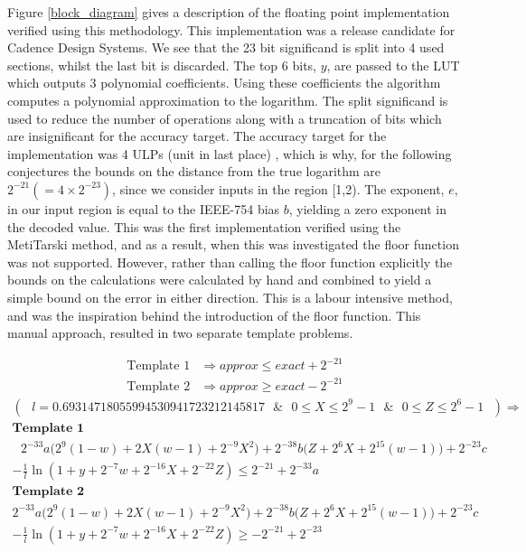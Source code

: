 \documentclass{fac}
\begin{document}
Figure \ref{block_diagram} gives a description of the floating point implementation verified using this methodology. This implementation was a release candidate for Cadence Design Systems. We see that the 23 bit significand is split into 4 used sections, whilst the last bit is discarded. The top 6 bits, $y$, are passed to the LUT which outputs 3 polynomial coefficients. Using these coefficients the algorithm computes a polynomial approximation to the logarithm. The split significand is used to reduce the number of operations along with a truncation of bits which are insignificant for the accuracy target. The accuracy target for the implementation was 4 ULPs (unit in last place) \cite{muller2010handbook}, which is why, for the following conjectures the bounds on the distance from the true logarithm are $2^{-21}(=4\times 2^{-23})$, since we consider inputs in the region [1,2). The exponent, $e$, in our input region is equal to the IEEE-754 bias $b$, yielding a zero exponent in the decoded value. This was the first implementation verified using the MetiTarski method, and as a result, when this was investigated the floor function was not supported. However, rather than calling the floor function explicitly the bounds on the calculations were calculated by hand and combined to yield a simple bound on the error in either direction. This is a labour intensive method, and was the inspiration behind the introduction of the floor function. This manual approach, resulted in two separate template problems. 

\begin{align*}
    \textrm{Template 1} &\Rightarrow approx \leq exact + 2^{-21} \\
    \textrm{Template 2} &\Rightarrow approx \geq exact - 2^{-21}
\end{align*}
\begin{multline*}
(\textrm{ }l=0.69314718055994530941723212145817\textrm{ } \&\textrm{ } 0\leq X \leq2^9-1\textrm{ } \& \textrm{ }0\leq Z \leq 2^6-1\textrm{ }) \Rightarrow \\ 
\textbf{Template 1} \\
  \textrm{ }  2^{-33} a\Big(2^9(1-w)+2X(w-1)+ 2^{-9}X^{2}\Big)   +  2^{-38} b\Big(Z +2^{6}X + 2^{15}(w-1)\Big)+  2^{-23}c\\
-  \frac{1}{l}\ln(1+y+2^{-7}w+2^{-16}X+2^{-22}Z)      \leq 2^{-21}+2^{-33}a 
\end{multline*} 
\begin{multline*}
\textbf{Template 2} \\
2^{-33} a\Big(2^9(1-w)+2X(w-1)+ 2^{-9}X^{2}\Big)   +  2^{-38} b\Big(Z +2^{6}X + 2^{15}(w-1)\Big)+  2^{-23}c\\
-  \frac{1}{l}\ln(1+y+2^{-7}w+2^{-16}X+2^{-22}Z)      \geq -2^{-21}+2^{-23}
\end{multline*}
\end{document}
